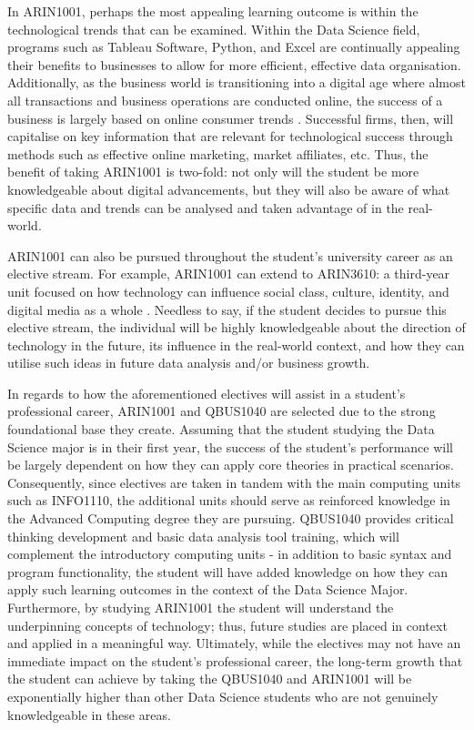 In ARIN1001, perhaps the most appealing learning outcome is within the technological trends that can be examined. Within the Data Science field, programs such as Tableau Software, Python, and Excel are continually appealing their benefits to businesses to allow for more efficient, effective data organisation. Additionally, as the business world is transitioning into a digital age where almost all transactions and business operations are conducted online, the success of a business is largely based on online consumer trends \cite{AusGOV}. Successful firms, then, will capitalise on key information that are relevant for technological success through methods such as effective online marketing, market affiliates, etc. Thus, the benefit of taking ARIN1001 is two-fold: not only will the student be more knowledgeable about digital advancements, but they will also be aware of what specific data and trends can be analysed and taken advantage of in the real-world. 


ARIN1001 can also be pursued throughout the student’s university career as an elective stream. For example, ARIN1001 can extend to ARIN3610: a third-year unit focused on how technology can influence social class, culture, identity, and digital media as a whole \cite{Usyd1}. Needless to say, if the student decides to pursue this elective stream, the individual will be highly knowledgeable about the direction of technology in the future, its influence in the real-world context, and how they can utilise such ideas in future data analysis and/or business growth. 


In regards to how the aforementioned electives will assist in a student’s professional career, ARIN1001 and QBUS1040 are selected due to the strong foundational base they create. Assuming that the student studying the Data Science major is in their first year, the success of the student’s performance will be largely dependent on how they can apply core theories in practical scenarios. Consequently, since electives are taken in tandem with the main computing units such as INFO1110, the additional units should serve as reinforced knowledge in the Advanced Computing degree they are pursuing. QBUS1040 provides critical thinking development and basic data analysis tool training, which will complement the introductory computing units - in addition to basic syntax and program functionality, the student will have added knowledge on how they can apply such learning outcomes in the context of the Data Science Major. Furthermore, by studying ARIN1001 the student will understand the underpinning concepts of technology; thus, future studies are placed in context and applied in a meaningful way. Ultimately, while the electives may not have an immediate impact on the student’s professional career, the long-term growth that the student can achieve by taking the QBUS1040 and ARIN1001 will be exponentially higher than other Data Science students who are not genuinely knowledgeable in these areas. 



